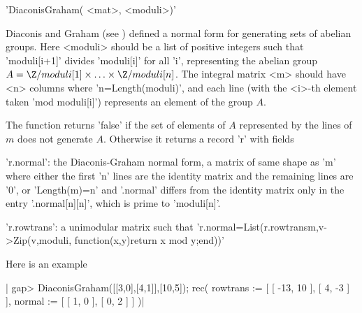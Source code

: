 'DiaconisGraham( <mat>, <moduli>)'

Diaconis  and Graham (see \cite{dg99}) defined a normal form for generating
sets of abelian groups. Here <moduli> should be a list of positive integers
such  that 'moduli[i+1]' divides 'moduli[i]'  for all 'i', representing the
abelian  group $A=\Z/moduli[1]\times\ldots\times\Z/moduli[n]$. The integral
matrix  <m> should have <n> columns where 'n=Length(moduli)', and each line
(with  the <i>-th element  taken 'mod moduli[i]')  represents an element of
the group $A$.

The  function returns 'false' if the set  of elements of $A$ represented by
the  lines of $m$ does not generate  $A$. Otherwise it returns a record 'r'
with fields

'r.normal':         the Diaconis-Graham normal form, a matrix of same shape
    as 'm' where either the first 'n' lines are the identity matrix and the
    remaining  lines are '0',  or 'Length(m)=n' and  '.normal' differs from
    the  identity matrix only in the  entry '.normal[n][n]', which is prime
    to 'moduli[n]'.

'r.rowtrans':        a unimodular matrix such that  
    'r.normal=List(r.rowtrans\*m,v->Zip(v,moduli,
                                       function(x,y)return x mod y;end))'

Here is an example\:

|    gap> DiaconisGraham([[3,0],[4,1]],[10,5]);
    rec(
      rowtrans := [ [ -13, 10 ], [ 4, -3 ] ],
      normal := [ [ 1, 0 ], [ 0, 2 ] ] )|
